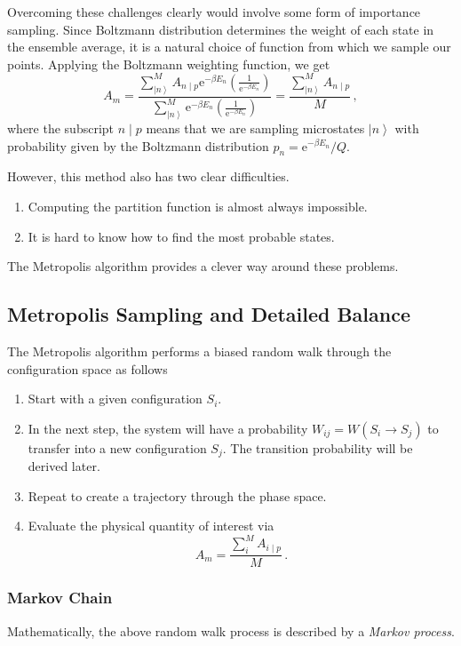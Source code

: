 \documentclass{article}
\theoremstyle{plain}\theoremheaderfont{\normalfont\itshape}\theorembodyfont{\rmfamily}\theoremseparator{.}\newtheorem*{rem}{Remark}\newtheorem*{ex}{Example}\newtheorem*{proof}{Proof}\newtheorem*{altp}{Alternative proof}
\theoremstyle{plain}\theoremheaderfont{\normalfont\bfseries}\theorembodyfont{\rmfamily}\theoremseparator{.}\newtheorem{thm}{Theorem}[section]\newtheorem{lem}[thm]{Lemma}\newtheorem{prop}[thm]{Proposition}\newtheorem*{cor}{Corollary}\newtheorem{defn}[thm]{Definition}\newtheorem{clm}[thm]{Claim}\newtheorem{clminproof}{Claim}\newtheorem{alg}[thm]{Algorithm}\newtheorem{hyp}[thm]{Hypothesis}\newtheorem{law}[thm]{Law}
\theoremstyle{break}\theoremheaderfont{\normalfont\itshape}\theorembodyfont{\rmfamily}\theoremseparator{.\medskip}\newtheorem*{proofskip}{Proof}\newtheorem*{exs}{Examples}\newtheorem*{rems}{Remarks}
\theoremstyle{break}\theoremheaderfont{\normalfont\bfseries}\theorembodyfont{\rmfamily}\theoremseparator{.\medskip}\newtheorem{lemskip}[thm]{Lemma}\newtheorem{defnskip}[thm]{Definition}\newtheorem{propskip}[thm]{Proposition}\newtheorem{thmskip}[thm]{Theorem}
\numberwithin{equation}{section}
\newcommand{\ee}{\mathrm{e}}
\newcommand{\ket}[1]{\left| #1 \right\rangle}
\begin{document}
    Overcoming these challenges clearly would involve some form of importance sampling. Since Boltzmann distribution determines the weight of each state in the ensemble average, it is a natural choice of function from which we sample our points. Applying the Boltzmann weighting function, we get
    \begin{equation}
        A_m=\frac{\sum_{\ket{n}}^{M}A_{n\mid p}\ee^{-\beta E_n}(\frac{1}{\ee^{-\beta E_n}})}{\sum_{\ket{n}}^{M}\ee^{-\beta E_n}(\frac{1}{\ee^{-\beta E_n}})}=\frac{\sum_{\ket{n}}^{M}A_{n\mid p}}{M}\,,
    \end{equation}
    where the subscript \(n\mid p\) means that we are sampling microstates \(\ket{n}\) with probability given by the Boltzmann distribution \(p_n=\ee^{-\beta E_n}/Q\).

    However, this method also has two clear difficulties.
    \begin{enumerate}[topsep=0pt]
        \item Computing the partition function is almost always impossible.
        \item It is hard to know how to find the most probable states.
    \end{enumerate}
    The Metropolis algorithm provides a clever way around these problems.

    \subsection{Metropolis Sampling and Detailed Balance}
    The Metropolis algorithm performs a biased random walk through the configuration space as follows
    \begin{enumerate}
        \item Start with a given configuration \(S_i\).
        \item In the next step, the system will have a probability \(W_{ij}=W(S_i\to S_j)\) to transfer into a new configuration \(S_j\). The transition probability will be derived later.
        \item Repeat to create a trajectory through the phase space.
        \item Evaluate the physical quantity of interest via
        \begin{equation}
            A_m=\frac{\sum_i^M A_{i\mid p}}{M}\,.
        \end{equation}
    \end{enumerate}

    \subsubsection{Markov Chain}
    Mathematically, the above random walk process is described by a \textit{Markov process}.
\end{document}
